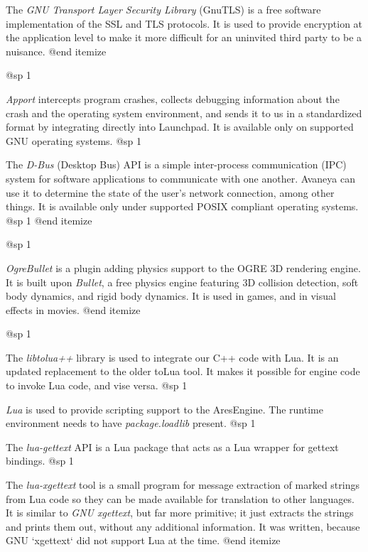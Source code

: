 \item
The {\sl GNU Transport Layer Security Library} (GnuTLS) is a free software implementation of the SSL and TLS protocols. It is used to provide encryption at the application level to make it more difficult for an uninvited third party to be a nuisance.
@end itemize

@sp 1

\itemize
\item
{\sl Apport} intercepts program crashes, collects debugging information about the crash and the operating system environment, and sends it to us in a standardized format by integrating directly into Launchpad. It is available only on supported GNU operating systems.
@sp 1

\item
The {\sl D-Bus} (Desktop Bus) API is a simple inter-process communication (IPC) system for software applications to communicate with one another. Avaneya can use it to determine the state of the user's network connection, among other things. It is available only under supported POSIX compliant operating systems.
@sp 1
@end itemize

@sp 1

\itemize
\item
{\sl OgreBullet} is a plugin adding physics support to the OGRE 3D rendering engine. It is built upon {\sl Bullet}, a free physics engine featuring 3D collision detection, soft body dynamics, and rigid body dynamics. It is used in games, and in visual effects in movies.
@end itemize


@sp 1

\itemize

\item
The {\sl libtolua++} library is used to integrate our C++ code with Lua. It is an updated replacement to the older toLua tool. It makes it possible for engine code to invoke Lua code, and vise versa.
@sp 1

\item
{\sl Lua} is used to provide scripting support to the AresEngine. The runtime environment needs to have {\sl package.loadlib} present.
@sp 1

\item
The {\sl lua-gettext} API is a Lua package that acts as a Lua wrapper for gettext bindings.
@sp 1

\item
The {\sl lua-xgettext} tool is a small program for message extraction of marked strings from Lua code so they can be made available for translation to other languages. It is similar to {\sl GNU xgettext}, but far more primitive; it just extracts the strings and prints them out, without any additional information. It was written, because GNU `xgettext` did not support Lua at the time.
@end itemize


